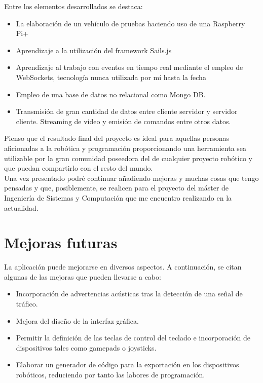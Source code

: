 Entre los elementos desarrollados se destaca:

\begin{itemize}
 \item La elaboración de un vehículo de pruebas haciendo uso de una Raspberry Pi+
 \item Aprendizaje a la utilización del framework Sails.js
 \item Aprendizaje al trabajo con eventos en tiempo real mediante el empleo de WebSockets, tecnología nunca utilizada por mí hasta la fecha
 \item Empleo de una base de datos no relacional como Mongo DB.
 \item Transmisión de gran cantidad de datos entre cliente servidor y servidor cliente. Streaming de vídeo y emisión de comandos entre otros datos.
\end{itemize}


Pienso que el resultado final del proyecto es ideal para aquellas personas aficionadas a la robótica y programación proporcionando una herramienta sea utilizable por la gran comunidad poseedora del de cualquier proyecto robótico y que puedan compartirlo con el resto del mundo.\\

Una vez presentado podré continuar añadiendo mejoras y muchas cosas que tengo pensadas y que, posiblemente, se realicen para el proyecto del máster de Ingeniería de Sistemas y Computación que me encuentro realizando en la actualidad.

\section{Mejoras futuras}

La aplicación puede mejorarse en diversos aspectos. A continuación, se citan algunas de las mejoras que pueden llevarse a cabo:

\begin{itemize}

\item Incorporación de advertencias acústicas tras la detección de una señal de tráfico.

\item Mejora del diseño de la interfaz gráfica.

\item Permitir la definición de las teclas de control del teclado e incorporación de dispositivos tales como gamepads o joysticks.

\item Elaborar un generador de código para la exportación en los dispositivos robóticos, reduciendo por tanto las labores de programación.

\end{itemize}


